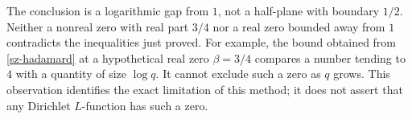 The conclusion is a logarithmic gap from $1$, not a half-plane with boundary
$1/2$. Neither a nonreal zero with real part $3/4$ nor a real zero bounded
away from $1$ contradicts the inequalities just proved. For example, the
bound obtained from \eqref{sz-hadamard} at a hypothetical real zero
$\beta=3/4$ compares a number tending to $4$ with a quantity of size
$\log q$. It cannot exclude such a zero as $q$ grows. This observation
identifies the exact limitation of this method; it does not assert that
any Dirichlet $L$-function has such a zero.

